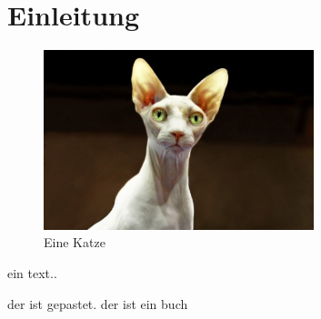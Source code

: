 \chapter{Einleitung}
\begin{figure}[htb]
	\centering
		\includegraphics[width=0.7\textwidth]{images/cat.jpg}
	\caption{Eine Katze \cite{id}}
\end{figure}
ein text..

der ist gepastet. \cite{id}
der ist ein buch \cite{book}
